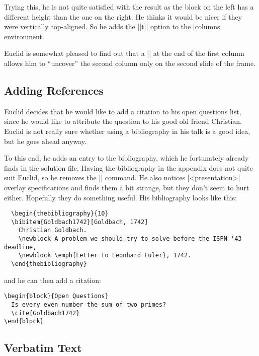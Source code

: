 Trying this, he is not quite satisfied with the result as the block on the left has a different height than the one on the right. He thinks it would be nicer if they were vertically top-aligned. So he adds the |[t]| option to the |columns| environment.

Euclid is somewhat pleased to find out that a |\pause| at the end of the first column allows him to ``uncover'' the second column only on the second slide of the frame.


\subsection{Adding References}

Euclid decides that he would like to add a citation to his open questions list, since he would like to attribute the question to his good old friend Christian. Euclid is not really sure whether using a bibliography in his talk is a good idea, but he goes ahead anyway.

To this end, he adds an entry to the bibliography, which he fortunately already finds in the solution file. Having the bibliography in the appendix does not quite suit Euclid, so he removes the |\appendix| command. He also notices |<presentation>| overlay specifications and finds them a bit strange, but they don't seem to hurt either. Hopefully they do something useful. His bibliography looks like this:
\begin{verbatim}
  \begin{thebibliography}{10}
  \bibitem{Goldbach1742}[Goldbach, 1742]
    Christian Goldbach.
    \newblock A problem we should try to solve before the ISPN '43 deadline,
    \newblock \emph{Letter to Leonhard Euler}, 1742.
  \end{thebibliography}
\end{verbatim}

and he can then add a citation:
\begin{verbatim}
\begin{block}{Open Questions}
  Is every even number the sum of two primes?
  \cite{Goldbach1742}
\end{block}
\end{verbatim}


\subsection{Verbatim Text}

